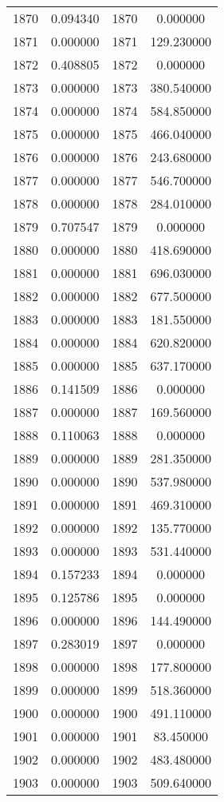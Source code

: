 \documentclass[12pt]{article}
\begin{document}
\begin{longtable}{@{}cccc@{}}
1870 & 0.094340 & 1870 & 0.000000 \\
1871 & 0.000000 & 1871 & 129.230000 \\
1872 & 0.408805 & 1872 & 0.000000 \\
1873 & 0.000000 & 1873 & 380.540000 \\
1874 & 0.000000 & 1874 & 584.850000 \\
1875 & 0.000000 & 1875 & 466.040000 \\
1876 & 0.000000 & 1876 & 243.680000 \\
1877 & 0.000000 & 1877 & 546.700000 \\
1878 & 0.000000 & 1878 & 284.010000 \\
1879 & 0.707547 & 1879 & 0.000000 \\
1880 & 0.000000 & 1880 & 418.690000 \\
1881 & 0.000000 & 1881 & 696.030000 \\
1882 & 0.000000 & 1882 & 677.500000 \\
1883 & 0.000000 & 1883 & 181.550000 \\
1884 & 0.000000 & 1884 & 620.820000 \\
1885 & 0.000000 & 1885 & 637.170000 \\
1886 & 0.141509 & 1886 & 0.000000 \\
1887 & 0.000000 & 1887 & 169.560000 \\
1888 & 0.110063 & 1888 & 0.000000 \\
1889 & 0.000000 & 1889 & 281.350000 \\
1890 & 0.000000 & 1890 & 537.980000 \\
1891 & 0.000000 & 1891 & 469.310000 \\
1892 & 0.000000 & 1892 & 135.770000 \\
1893 & 0.000000 & 1893 & 531.440000 \\
1894 & 0.157233 & 1894 & 0.000000 \\
1895 & 0.125786 & 1895 & 0.000000 \\
1896 & 0.000000 & 1896 & 144.490000 \\
1897 & 0.283019 & 1897 & 0.000000 \\
1898 & 0.000000 & 1898 & 177.800000 \\
1899 & 0.000000 & 1899 & 518.360000 \\
1900 & 0.000000 & 1900 & 491.110000 \\
1901 & 0.000000 & 1901 & 83.450000 \\
1902 & 0.000000 & 1902 & 483.480000 \\
1903 & 0.000000 & 1903 & 509.640000 \\

\end{longtable}
\end{document}
